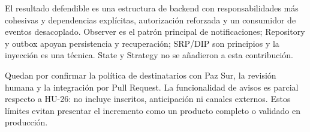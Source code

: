 El resultado defendible es una estructura de backend con responsabilidades más
cohesivas y dependencias explícitas, autorización reforzada y un consumidor de
eventos desacoplado. Observer es el patrón principal de notificaciones; Repository
y outbox apoyan persistencia y recuperación; SRP/DIP son principios y la inyección
es una técnica. State y Strategy no se añadieron a esta contribución.

Quedan por confirmar la política de destinatarios con Paz Sur, la revisión humana
y la integración por Pull Request. La funcionalidad de avisos es parcial respecto
a HU-26: no incluye inscritos, anticipación ni canales externos. Estos límites
evitan presentar el incremento como un producto completo o validado en producción.
